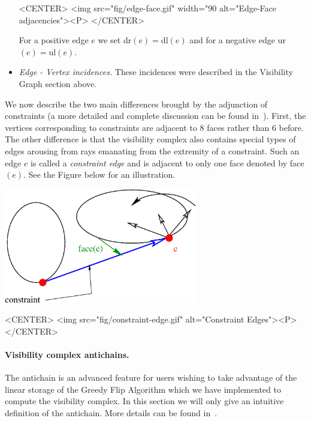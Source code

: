 \begin{itemize}
    \begin{ccHtmlOnly}
        <CENTER>
            <img src="fig/edge-face.gif" width="90%
             alt="Edge-Face adjacencies"><P>
        </CENTER>
    \end{ccHtmlOnly}
    For a positive edge $e$ we set dr$(e) = $dl$(e)$ and for a negative edge
    ur$(e) = $ul$(e)$.
    \item \emph{Edge - Vertex incidences. } These incidences were described in
    the Visibility Graph section above.
\end{itemize}

We now describe the two main differences brought by the adjunction of
constraints (a more detailed and complete discussion can be found
in~\cite{G-ap-sstvc-01}).  First, the vertices corresponding to constraints are
adjacent to $8$ faces rather than $6$ before. The other difference is that the
visibility complex also contains special types of edges arousing from rays
emanating from the extremity of a constraint. Such an edge $e$ is called a
\emph{constraint edge} and is adjacent to only one face denoted by face$(e)$.
See the Figure below for an illustration.
\begin{ccTexOnly}
    \begin{center}
        \includegraphics[height=5cm]{fig/constraint-edge.eps}%
    \end{center}
\end{ccTexOnly}

\begin{ccHtmlOnly}
    <CENTER>
        <img src="fig/constraint-edge.gif" alt="Constraint Edges"><P>
    </CENTER>
\end{ccHtmlOnly}

\paragraph{Visibility complex antichains. } The antichain is an advanced feature
for users wishing to take advantage of the linear storage of the Greedy Flip
Algorithm which we have implemented to compute the visibility complex. In this
section we will only give an intuitive definition of the antichain. More details
can be found in~\cite{pv-tsvcpt-96}. 

